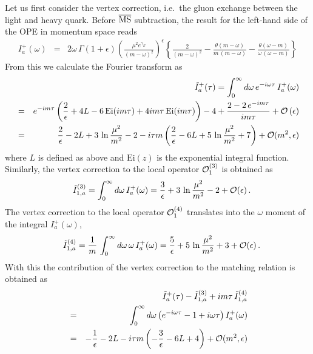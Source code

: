 \documentclass[a4paper,11pt]{article}
\begin{document}
Let us first consider the vertex correction, i.e.\ the gluon exchange between the light and heavy quark. Before $\overline{\rm MS}$ subtraction, the result for the left-hand side of the OPE in momentum space reads \cite{Bell:2008er}
\begin{eqnarray}
	I_a^+(\omega) &=& 2\omega \, \Gamma(1+\epsilon) 
	\left( \frac{\mu^2 e^{\gamma_E}}{(m-\omega)^2} \right)^\epsilon 
	\left\{ \frac{2}{(m-\omega)^2} - \frac{\theta(m-\omega)}{m \, (m-\omega)} - \frac{\theta(\omega-m)}{\omega\,(\omega-m)}\right\}
\end{eqnarray}
%
From this we calculate the Fourier transform as 
\begin{eqnarray} 
  &&\tilde I_a^+(\tau) 
  =  \int_0^\infty d\omega \, e^{ - i \omega \tau} \, I_a^+(\omega) 
   \cr 
   &=& e^{-im\tau} \left( \frac{2}{\epsilon} + 4 L - 
   6 \, {\rm Ei}(im\tau) + 4 i m\tau \, {\rm Ei}(im\tau) \right)
       -4 
       + \frac{2-2 \, e^{-im\tau}}{im\tau} 
       + {\cal O}\left(\epsilon \right)
       \cr 
   &=&  \frac{2}{\epsilon} - 2 L + 3 \, \ln \frac{\mu^2}{m^2} - 2 
   - i \tau m \left( \frac{2}{\epsilon} -6 L + 5 \, \ln \frac{\mu^2}{m^2} + 7 \right) 
   + {\cal O}(m^2,\epsilon)
\end{eqnarray}
where $L$ is defined as above and $\mathrm{Ei}(z)$ is the exponential integral function.
Similarly, the vertex correction to the local operator ${\cal O}_1^{(3)}$ is obtained as \cite{Bell:2008er}
\begin{eqnarray}
  &&  \tilde I_{1,a}^{(3)} = \int_0^\infty d\omega \, I_a^+(\omega) 
  = \frac{3}{\epsilon} + 3 \, \ln \frac{\mu^2}{m^2} -2 + {\cal O}(\epsilon) \,.
\end{eqnarray}
The vertex correction to the local operator ${\cal O}_1^{(4)}$ 
translates into the $\omega$ moment of the integral $I_a^+(\omega)$,
\begin{eqnarray}
 &&    \tilde I_{1,a}^{(4)} = \frac{1}{m} \,
 \int_0^\infty d\omega \, \omega  \, I_a^+(\omega) = 
 \frac{5}{\epsilon} + 5 \, \ln \frac{\mu^2}{m^2} + 3 + {\cal O}(\epsilon) \,.
\end{eqnarray}
With this the contribution of the vertex correction to the matching relation is obtained as
\begin{eqnarray}
 && \tilde I_a^+(\tau) - \tilde I_{1,a}^{(3)} + im\tau \, \tilde I_{1,a}^{(4)} 
 \cr 
 &=& \int_0^\infty d\omega \left( e^{-i\omega \tau} - 1 +i \omega \tau   \right) I_a^+(\omega)
  \cr
  &=& - \frac{1}{\epsilon} - 2 L  - i\tau m \left( -\frac{3}{\epsilon} -6 L + 4 \right) + {\cal O}(m^2,\epsilon)
  \label{eq:Iatilde}
\end{eqnarray} 
\end{document}
